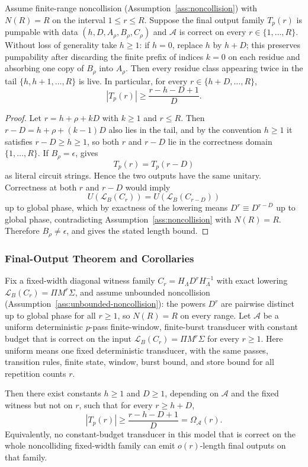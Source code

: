 \begin{lemma}
\label{app:lem:no-collapse}
Assume finite-range noncollision (Assumption~\ref{ass:noncollision}) with
$N(R)=R$ on the interval $1\le r\le R$. Suppose the final output family
$T_p(r)$ is pumpable with data $(h,D,A_\rho,B_\rho,C_\rho)$ and
$\mathcal{A}$ is correct on every $r\in\{1,\ldots,R\}$. Without loss of
generality take $h\ge1$: if $h=0$, replace $h$ by $h+D$; this preserves
pumpability after discarding the finite prefix of indices $k=0$ on each residue
and absorbing one copy of $B_\rho$ into $A_\rho$. Then every residue class
appearing twice in the tail $\{h,h+1,\ldots,R\}$ is live. In particular, for
every $r\in\{h+D,\ldots,R\}$,
\[
  |T_p(r)|\ge \frac{r-h-D+1}{D}.
\]
\end{lemma}

\begin{proof}
Let $r=h+\rho+kD$ with $k\ge1$ and $r\le R$. Then
$r-D=h+\rho+(k-1)D$ also lies in the tail, and by the convention $h\ge1$ it
satisfies $r-D\ge h\ge1$, so both $r$ and $r-D$ lie in the correctness domain
$\{1,\ldots,R\}$. If $B_\rho=\epsilon$,
 gives
\[
  T_p(r)=T_p(r-D)
\]
as literal circuit strings. Hence the two outputs have the same unitary.
Correctness at both $r$ and $r-D$ would imply
\[
U(\mathcal{L}_B(C_r))=U(\mathcal{L}_B(C_{r-D}))
\]
up to global phase, which by exactness of the lowering means $D^r\equiv
D^{r-D}$ up to global phase, contradicting Assumption~\ref{ass:noncollision}
with $N(R)=R$. Therefore $B_\rho\ne\epsilon$, and
 gives the stated length bound.
\end{proof}

\subsubsection{Final-Output Theorem and Corollaries}

\begin{theorem}
\label{app:thm:final-output}
Fix a fixed-width diagonal witness family
$C_r=H_\Lambda D^rH_\Lambda^{-1}$ with exact lowering
$\mathcal{L}_B(C_r)=\Pi M^r\Sigma$, and assume unbounded noncollision
(Assumption~\ref{ass:unbounded-noncollision}): the powers $D^r$ are pairwise
distinct up to global phase for all $r\ge1$, so $N(R)=R$ on every range. Let
$\mathcal{A}$ be a uniform deterministic $p$-pass finite-window, finite-burst
transducer with constant budget that is correct on the input
$\mathcal{L}_B(C_r)=\Pi M^r\Sigma$ for every $r\ge1$.
Here uniform means one fixed deterministic transducer, with the same passes,
transition rules, finite state, window, burst bound, and store bound for all
repetition counts $r$.

Then there exist constants $h\ge1$ and $D\ge1$, depending on $\mathcal{A}$ and
the fixed witness but not on $r$, such that for every $r\ge h+D$,
\[
  |T_p(r)|\ge \frac{r-h-D+1}{D}=\Omega_{\mathcal{A}}(r).
\]
Equivalently, no constant-budget transducer in this model that is correct on
the whole noncolliding fixed-width family can emit $o(r)$-length final outputs
on that family.
\end{theorem}

